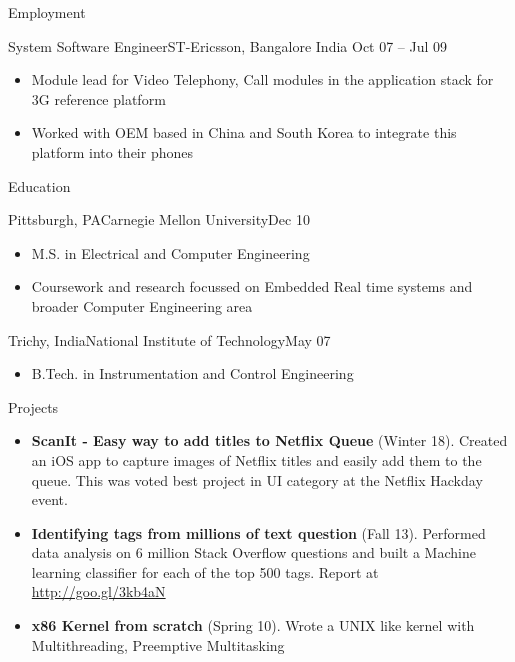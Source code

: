 \documentclass[]{mcdowellcv}
\begin{document}
\begin{cvsection}{Employment}
		\begin{cvsubsection}{System Software Engineer}{ST-Ericsson, Bangalore India }{Oct 07 -- Jul 09}
			\begin{itemize}
				\item Module lead for Video Telephony, Call modules in the application stack for 3G reference platform
				\item Worked with OEM based in China and South Korea to integrate this platform into their phones
			\end{itemize}
		\end{cvsubsection}

	\end{cvsection}
	
	\begin{cvsection}{Education}
		\begin{cvsubsection}{Pittsburgh, PA}{Carnegie Mellon University}{Dec 10}
			\begin{itemize}
				\item M.S. in Electrical and Computer Engineering
				\item Coursework and research focussed on Embedded Real time systems and broader Computer Engineering area
			\end{itemize}
		\end{cvsubsection}
		\begin{cvsubsection}{Trichy, India}{National Institute of Technology}{May 07}
			\begin{itemize}
				\item B.Tech. in Instrumentation and Control Engineering
			\end{itemize}
		\end{cvsubsection}
	\end{cvsection}

	\begin{cvsection}{Projects}
		\begin{cvsubsection}{}{}{}	
			\begin{itemize}
				\item \textbf{ScanIt - Easy way to add titles to Netflix Queue} (Winter 18). Created an iOS app to capture images of Netflix titles and easily add them to the queue. This was voted best project in UI category at the Netflix Hackday event.   
				\item \textbf{Identifying tags from millions of text question} (Fall 13). Performed data analysis on 6 million Stack Overflow questions and built a Machine learning classifier for  each of the top 500 tags. Report at \url{http://goo.gl/3kb4aN}
				\item \textbf{x86 Kernel from scratch} (Spring 10).  Wrote a UNIX like kernel with Multithreading, Preemptive Multitasking
			\end{itemize}
		\end{cvsubsection}
	\end{cvsection}
	
\end{document}
